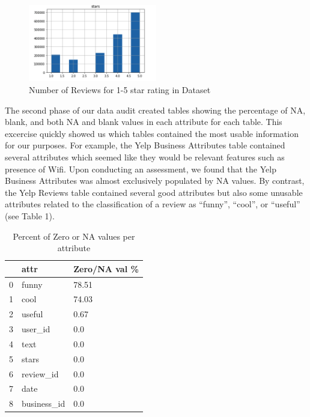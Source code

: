 \documentclass[12pt]{article}
\begin{document}
\begin{figure}[h]
  \caption{Number of Reviews for 1-5 star rating in Dataset}
  \centering
  \includegraphics[width=0.5\textwidth]{rating}
\end{figure}

The second phase of our data audit created tables showing the percentage of NA, blank, and
both NA and blank values in each attribute for each table. This excercise quickly showed us
which tables contained the most usable information for our purposes. For example, the Yelp
Business Attributes table contained several attributes which seemed like they would be
relevant features such as presence of Wifi. Upon conducting an assessment, we found that
the Yelp Business Attributes was almost exclusively populated by NA values. By contrast, the
Yelp Reviews table contained several good attributes but also some unusable attributes
related to the classification of a review as ``funny'', ``cool'', or ``useful'' (see Table 1).

  \begin{table}[h]
	\caption{Percent of Zero or NA values per attribute}
	\centering
	\begin{tabular}{|l|l|l|}
	\hline
    \textbf{} & \textbf{attr} & \textbf{Zero/NA val \%} \\
	\hline 
	0         & funny     & 78.51    \\
	\hline 
	1         & cool      & 74.03  \\
 	\hline 
 	2 & useful      & 0.67    \\
 	\hline
 	3 & user_id      & 0.0   \\
 	\hline
 	4 & text      & 0.0    \\
 	\hline
 	5 & stars      & 0.0   \\
 	\hline
 	6 & review_id      & 0.0   \\
 	\hline
 	7 & date      & 0.0   \\
 	\hline
 	8 & business_id      & 0.0  \\
 	\hline
\end{tabular}
\end{table}
  
\end{document}
